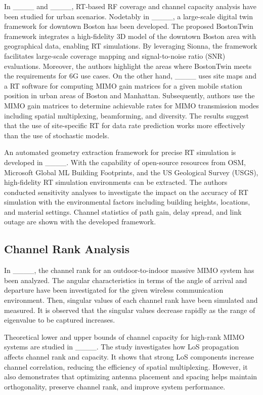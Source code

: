 In ____ and ____, RT-based RF coverage and channel capacity analysis have been studied for urban scenarios. Nodetably in ____, a large-scale digital twin framework for downtown Boston has been developed. The proposed BostonTwin framework integrates a high-fidelity 3D model of the downtown Boston area with geographical data, enabling RT simulations. By leveraging Sionna, the framework facilitates large-scale coverage mapping and signal-to-noise ratio (SNR) evaluations. Moreover, the authors highlight the areas where BostonTwin meets the requirements for 6G use cases. On the other hand, ____ uses site maps and a RT software for computing MIMO gain matrices for a given mobile station position in urban areas of Boston and Manhattan. Subsequently, authors use the MIMO gain matrices to determine achievable rates for MIMO transmission modes including spatial multiplexing, beamforming, and diversity. The results suggest that the use of site-specific RT for data rate prediction works more effectively than the use of stochastic models.

An automated geometry extraction framework for precise RT simulation is developed in ____. With the capability of open-source resources from OSM, Microsoft Global ML Building Footprints, and the US Geological Survey (USGS), high-fidelity RT simulation environments can be extracted. The authors conducted sensitivity analyses to investigate the impact on the accuracy of RT simulation with the environmental factors including building heights, locations, and material settings. Channel statistics of path gain, delay spread, and link outage are shown with the developed framework. 


\subsection{Channel Rank Analysis}
In ____, the channel rank for an outdoor-to-indoor massive MIMO system has been analyzed. The angular characteristics in terms of the angle of arrival and departure have been investigated for the given wireless communication environment. Then, singular values of each channel rank have been simulated and measured. It is observed that the singular values decrease rapidly as the range of eigenvalue to be captured increases. 

Theoretical lower and upper bounds of channel capacity for high-rank MIMO systems are studied in ____. The study investigates how LoS propagation affects channel rank and capacity. It shows that strong LoS components increase channel correlation, reducing the efficiency of spatial multiplexing. However, it also demonstrates that optimizing antenna placement and spacing helps maintain orthogonality, preserve channel rank, and improve system performance.


